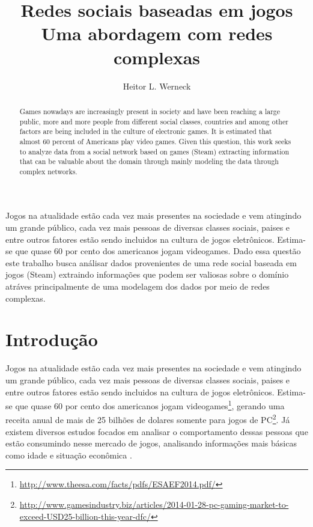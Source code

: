 \documentclass[12pt]{article}
\title{Redes sociais baseadas em jogos\\ Uma abordagem com redes complexas}
\author{Heitor L. Werneck\inst{1}}
\begin{document}
 

\maketitle

\begin{abstract}
				Games nowadays are increasingly present in society and have been reaching a large public, more and more people from different social classes, countries and among other factors are being included in the culture of electronic games. It is estimated that almost 60 percent of Americans play video games. Given this question, this work seeks to analyze data from a social network based on games (Steam) extracting information that can be valuable about the domain through mainly modeling the data through complex networks.
\end{abstract}
     
\begin{resumo} 
				Jogos na atualidade estão cada vez mais presentes na sociedade e vem atingindo um grande público, cada vez mais pessoas de diversas classes sociais, paises e entre outros fatores estão sendo incluidos na cultura de jogos eletrônicos. Estima-se que quase 60 por cento dos americanos jogam videogames. Dado essa questão este trabalho busca análisar dados provenientes de uma rede social baseada em jogos (Steam) extraindo informações que podem ser valiosas sobre o domínio atráves principalmente de uma modelagem dos dados por meio de redes complexas.
\end{resumo}


\section{Introdução}

Jogos na atualidade estão cada vez mais presentes na sociedade e vem atingindo um grande público, cada vez mais pessoas de diversas classes sociais, paises e entre outros fatores estão sendo incluidos na cultura de jogos eletrônicos. Estima-se que quase 60 por cento dos americanos jogam videogames\footnote{\url{http://www.theesa.com/facts/pdfs/ESAEF2014.pdf/}}, gerando uma receita anual de mais de 25 bilhões de dolares somente para jogos de PC\footnote{\url{http://www.gamesindustry.biz/articles/2014-01-28-pc-gaming-market-to-exceed-USD25-billion-this-year-dfc/}}. Já existem diversos estudos focados em analisar o comportamento dessas pessoas que estão consumindo nesse mercado de jogos, analisando informações mais básicas como idade e situação econômica \cite{williams2008plays,griffiths2003breaking,kowert2014unpopular}.
\end{document}
